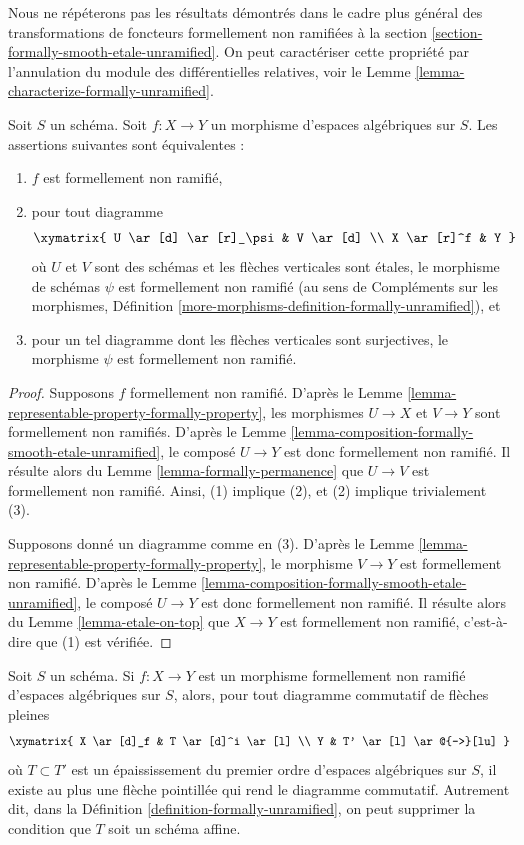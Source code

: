 \noindent
Nous ne répéterons pas les résultats démontrés dans le cadre plus général des
transformations de foncteurs formellement non ramifiées à la
section \ref{section-formally-smooth-etale-unramified}.
On peut caractériser cette propriété par l'annulation du
module des différentielles relatives, voir le
Lemme \ref{lemma-characterize-formally-unramified}.

\begin{lemma}
\label{lemma-formally-unramified}
Soit $S$ un schéma. Soit $f : X \to Y$ un morphisme d'espaces algébriques sur
$S$. Les assertions suivantes sont équivalentes :
\begin{enumerate}
\item $f$ est formellement non ramifié,
\item pour tout diagramme
$$
\xymatrix{
U \ar[d] \ar[r]_\psi & V \ar[d] \\
X \ar[r]^f & Y
}
$$
où $U$ et $V$ sont des schémas et les flèches verticales sont étales,
le morphisme de schémas $\psi$ est formellement non ramifié (au sens de
Compléments sur les morphismes,
Définition \ref{more-morphisms-definition-formally-unramified}), et
\item pour un tel diagramme dont les flèches verticales sont surjectives, le morphisme
$\psi$ est formellement non ramifié.
\end{enumerate}
\end{lemma}

\begin{proof}
Supposons $f$ formellement non ramifié. D'après le
Lemme \ref{lemma-representable-property-formally-property},
les morphismes $U \to X$ et $V \to Y$ sont formellement non ramifiés. D'après le
Lemme \ref{lemma-composition-formally-smooth-etale-unramified},
le composé $U \to Y$ est donc formellement non ramifié. Il résulte alors du
Lemme \ref{lemma-formally-permanence}
que $U \to V$ est formellement non ramifié. Ainsi, (1) implique (2), et (2)
implique trivialement (3).

\medskip\noindent
Supposons donné un diagramme comme en (3). D'après le
Lemme \ref{lemma-representable-property-formally-property},
le morphisme $V \to Y$ est formellement non ramifié. D'après le
Lemme \ref{lemma-composition-formally-smooth-etale-unramified},
le composé $U \to Y$ est donc formellement non ramifié. Il résulte alors du
Lemme \ref{lemma-etale-on-top}
que $X \to Y$ est formellement non ramifié, c'est-à-dire que (1) est vérifiée.
\end{proof}

\begin{lemma}
\label{lemma-formally-unramified-not-affine}
Soit $S$ un schéma.
Si $f : X \to Y$ est un morphisme formellement non ramifié d'espaces algébriques
sur $S$, alors, pour tout diagramme commutatif de flèches pleines
$$
\xymatrix{
X \ar[d]_f & T \ar[d]^i \ar[l] \\
Y & T' \ar[l] \ar@{-->}[lu]
}
$$
où $T \subset T'$ est un épaississement du premier ordre d'espaces algébriques
sur $S$, il existe au plus une flèche pointillée qui rend le diagramme commutatif.
Autrement dit, dans la
Définition \ref{definition-formally-unramified},
on peut supprimer la condition que $T$ soit un schéma affine.
\end{lemma}

